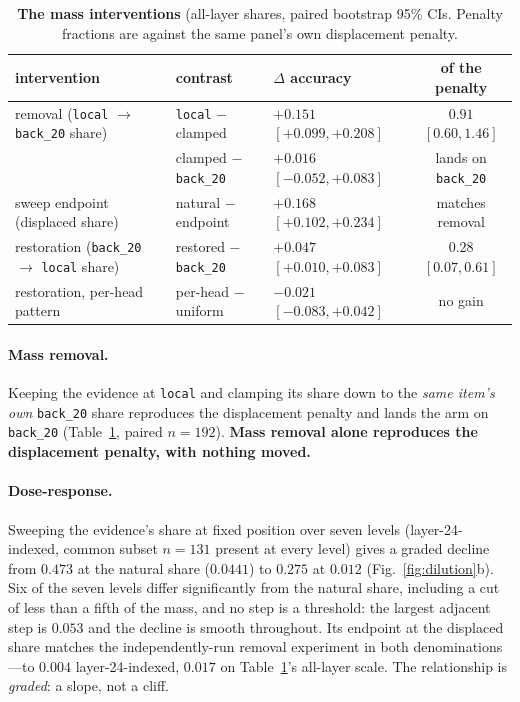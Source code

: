 \documentclass{article}
\begin{document}
\begin{table}[t]
  \centering\small
  \caption{\textbf{The mass interventions} (all-layer shares, paired bootstrap 95\% CIs.
  Penalty fractions are against the same panel's own displacement penalty.}
  \label{tab:mass}
  \setlength{\tabcolsep}{2.5pt}
  \begin{tabular}{lllc}
    \toprule
    intervention & contrast & $\Delta$ accuracy & of the penalty\\
    \midrule
    removal (\texttt{local} $\to$ \texttt{back\_20} share) & \texttt{local} $-$ clamped & $+0.151$ $[+0.099,+0.208]$ & $0.91$ $[0.60,1.46]$\\
     & clamped $-$ \texttt{back\_20} & $+0.016$ $[-0.052,+0.083]$ & lands on \texttt{back\_20}\\
    sweep endpoint (displaced share) & natural $-$ endpoint & $+0.168$ $[+0.102,+0.234]$ & matches removal\\
    restoration (\texttt{back\_20} $\to$ \texttt{local} share) & restored $-$ \texttt{back\_20} & $+0.047$ $[+0.010,+0.083]$ & $0.28$ $[0.07,0.61]$\\
    restoration, per-head pattern & per-head $-$ uniform & $-0.021$ $[-0.083,+0.042]$ & no gain\\
    \bottomrule
  \end{tabular}
\end{table}

\paragraph{Mass removal.}
Keeping the evidence at \texttt{local} and clamping its share down to the \emph{same item's own}
\texttt{back\_20} share reproduces the displacement penalty and lands the arm on
\texttt{back\_20} (Table~\ref{tab:mass}, paired $n{=}192$). \textbf{Mass removal alone
reproduces the displacement penalty, with nothing moved.}

\paragraph{Dose-response.}
Sweeping the evidence's share at fixed position over seven levels (layer-24-indexed, common
subset $n{=}131$ present
at every level) gives a graded decline from $0.473$ at the natural share ($0.0441$) to $0.275$ at
$0.012$ (Fig.~\ref{fig:dilution}b). Six of the seven levels differ significantly from the natural
share, including a cut of less than a fifth of the mass, and no step is a threshold: the largest
adjacent step is $0.053$ and the decline is smooth throughout. Its endpoint at the displaced
share matches the independently-run removal experiment in both denominations---to $0.004$
layer-24-indexed, $0.017$ on Table~\ref{tab:mass}'s all-layer scale. The
relationship is \emph{graded}: a slope, not a cliff.
\end{document}

